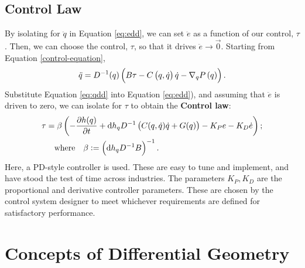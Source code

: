 \documentclass[main.tex]{subfiles}
\begin{document}
    \subsection{Control Law}
    By isolating for $\ddot{ q}$ in Equation \ref{eq:edd}, we can set $\ddot{{e}}$ as a function of our control, $\tau$. Then, we can choose the control, $\tau$, so that it drives $\ddot{{e}}\to \vec{0}$. Starting from Equation \ref{control-equation},
    \begin{align}
        \ddot{{q}}=D\inv({q})\del{B{\tau}
        -C\del[1]{ q,\qd}\qd-\nabla_qP\del{ q}}.\label{eq:qdd}
    \end{align}
    Substitute Equation \ref{eq:qdd} into Equation \ref{eq:edd}), and assuming that $\ddot{{e}}$ is driven to zero, we can isolate for ${\tau}$ to obtain the \textbf{Control law}:
    \begin{align}
    \begin{aligned}
        {\tau}&=\beta\del{-\pdv{h(q)}{t}+\dhq
        D\inv\del{C(q,\qd)\qd+G(q)}-K_Pe-K_D\dot{e}};\\
        &\qq{where}\beta:=\del{\dhq D\inv B}\inv.
    \end{aligned}\label{eq:controllaw}
    \end{align}
Here, a PD-style controller is used. These are easy to tune and implement, and have stood the test of time across industries\cite{franklin2002feedback}.
The parameters $K_P,K_D$ are the proportional and derivative controller parameters. These are chosen by the control system designer to meet whichever requirements are defined for satisfactory performance.


\section{Concepts of Differential Geometry}
    
    
\end{document}
